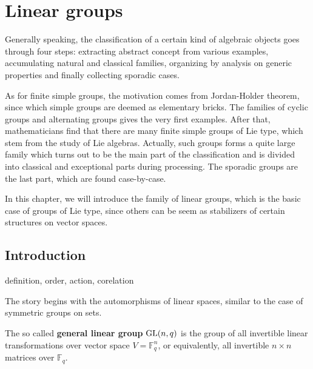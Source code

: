 \documentclass[a4paper,11pt]{article}
\def\maintitle#1{\section*{#1}}
\def\subtitle#1{\section{#1}}
\begin{document}
\else %
    \ifx\chaptitle\undefined %
        \def\maintitle#1{\subsection{#1}}
        \def\subtitle#1{\subsubsection{#1}}
    \else %
        \def\maintitle#1{\section{#1}}
        \def\subtitle#1{\subsection{#1}}
    \fi
\fi

\maintitle{Linear groups}

Generally speaking, the classification of a certain kind of algebraic objects goes through four steps: extracting abstract concept from various examples, accumulating natural and classical families, organizing by analysis on generic properties and finally collecting sporadic cases. 

As for finite simple groups, the motivation comes from Jordan-Holder theorem, since which simple groups are deemed as elementary bricks. The families of cyclic groups and alternating groups gives the very first examples. After that, mathematicians find that there are many finite simple groups of Lie type, which stem from the study of Lie algebras. Actually, such groups forms a quite large family which turns out to be the main part of the classification and is divided into classical and exceptional parts during processing. The sporadic groups are the last part, which are found case-by-case.

In this chapter, we will introduce the family of linear groups, which is the basic case of groups of Lie type, since others can be seem as stabilizers of certain structures on vector spaces.

\subtitle{Introduction}

definition, order, action, corelation

The story begins with the automorphisms of linear spaces, similar to the case of symmetric groups on sets.
\begin{definition}
    The so called \textbf{general linear group} $\mathrm{GL}(n,q)$ is the group of  all invertible linear transformations over vector space $V=\mathbb{F}_q^n$, or equivalently, all invertible $n\times n$ matrices over $\mathbb{F}_q$.
\end{definition}
\end{document}
